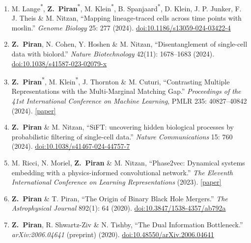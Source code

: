 \documentclass[11pt,letterpaper]{article}
\newcommand{\me}{\textbf{Z.~Piran}}
\newcommand{\equal}{\textsuperscript{*}}
\begin{document}
\begin{enumerate}
\item M. Lange\equal{}, \me{}\equal{}, M. Klein\equal{}, B. Spanjaard\equal{}, D. Klein, J. P. Junker, F. J. Theis \& M. Nitzan, ``Mapping lineage-traced cells across time points with moslin.'' \textit{Genome Biology} 25: 277 (2024). \href{https://doi.org/10.1186/s13059-024-03422-4}{doi:10.1186/s13059-024-03422-4}

\item \me{}, N. Cohen, Y. Hoshen \& M. Nitzan, ``Disentanglement of single-cell data with biolord.'' \textit{Nature Biotechnology} 42(11): 1678--1683 (2024). \href{https://doi.org/10.1038/s41587-023-02079-x}{doi:10.1038/s41587-023-02079-x}

\item \me{}\equal{}, M. Klein\equal{}, J. Thornton \& M. Cuturi, ``Contrasting Multiple Representations with the Multi-Marginal Matching Gap.'' \textit{Proceedings of the 41st International Conference on Machine Learning}, PMLR 235: 40827--40842 (2024). \href{https://proceedings.mlr.press/v235/piran24a.html}{[paper]}

\item \me{} \& M. Nitzan, ``SiFT: uncovering hidden biological processes by probabilistic filtering of single-cell data.'' \textit{Nature Communications} 15: 760 (2024). \href{https://doi.org/10.1038/s41467-024-44757-7}{doi:10.1038/s41467-024-44757-7}

\item M. Ricci, N. Moriel, \me{} \& M. Nitzan, ``Phase2vec: Dynamical systems embedding with a physics-informed convolutional network.'' \textit{The Eleventh International Conference on Learning Representations} (2023). \href{https://openreview.net/forum?id=z9C5dGip90}{[paper]}

\item \me{} \& T. Piran, ``The Origin of Binary Black Hole Mergers.'' \textit{The Astrophysical Journal} 892(1): 64 (2020). \href{https://doi.org/10.3847/1538-4357/ab792a}{doi:10.3847/1538-4357/ab792a}

\item \me{}, R. Shwartz-Ziv \& N. Tishby, ``The Dual Information Bottleneck.'' \textit{arXiv:2006.04641} (preprint) (2020). \href{https://doi.org/10.48550/arXiv.2006.04641}{doi:10.48550/arXiv.2006.04641}
\end{enumerate}
\end{document}
